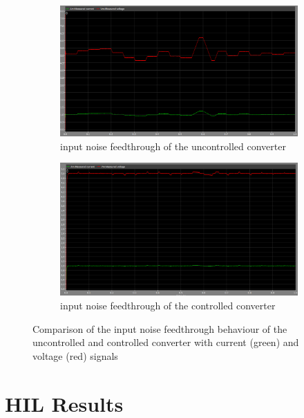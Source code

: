 \begin{figure}[htbp]
    \centering
    \begin{subfigure}[b]{0.49\textwidth}
        \centering
        \includegraphics[width=\textwidth]{img/v_i_noise_constant_load.png}
        \caption{input noise feedthrough of the uncontrolled converter}
        \label{fig:v_i_noise_feedthrough_uncontrolled}
    \end{subfigure}
    \hfill
    \begin{subfigure}[b]{0.49\textwidth}
        \centering
        \includegraphics[width=\textwidth]{img/v_i_noise_control_constant_load.png}
        \caption{input noise feedthrough of the controlled converter}
        \label{fig:v_i_noise_feedthrough_controlled}
    \end{subfigure}
    \caption{Comparison of the input noise feedthrough behaviour of the uncontrolled and controlled converter with current (green) and voltage (red) signals}
    \label{fig:comparison_input_noise_feedthrough}
\end{figure}

\section{HIL Results}
\label{section:hil_results}

